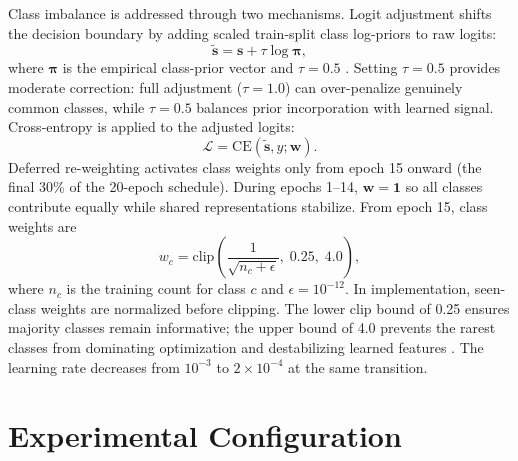\documentclass[11pt,a4paper]{report}
\begin{document}
Class imbalance is addressed through two mechanisms. Logit adjustment shifts the decision boundary by adding scaled train-split class log-priors to raw logits:
\begin{equation}
\tilde{\mathbf{s}} = \mathbf{s} + \tau \log \boldsymbol{\pi},
\end{equation}
where $\boldsymbol{\pi}$ is the empirical class-prior vector and $\tau = 0.5$ \cite{menon2021logit}. Setting $\tau = 0.5$ provides moderate correction: full adjustment ($\tau = 1.0$) can over-penalize genuinely common classes, while $\tau = 0.5$ balances prior incorporation with learned signal. Cross-entropy is applied to the adjusted logits:
\begin{equation}
\mathcal{L} = \mathrm{CE}(\tilde{\mathbf{s}}, y; \mathbf{w}).
\end{equation}
Deferred re-weighting activates class weights only from epoch 15 onward (the final 30\% of the 20-epoch schedule). During epochs 1--14, $\mathbf{w} = \mathbf{1}$ so all classes contribute equally while shared representations stabilize. From epoch 15, class weights are
\begin{equation}
w_c = \mathrm{clip}\!\left(\frac{1}{\sqrt{n_c + \epsilon}},\; 0.25,\; 4.0\right),
\end{equation}
where $n_c$ is the training count for class $c$ and $\epsilon = 10^{-12}$. In implementation, seen-class weights are normalized before clipping. The lower clip bound of 0.25 ensures majority classes remain informative; the upper bound of 4.0 prevents the rarest classes from dominating optimization and destabilizing learned features \cite{cao2019ldam}. The learning rate decreases from $10^{-3}$ to $2 \times 10^{-4}$ at the same transition.

\section{Experimental Configuration}
\end{document}
